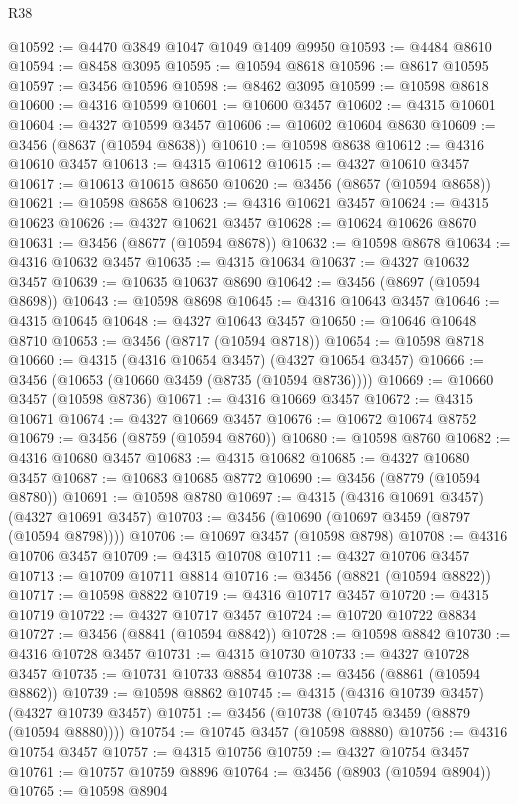 \begin{lexlean}{R38}
\begin{coremodule}
@10592 := @4470 @3849 @1047 @1049 @1409 @9950
@10593 := @4484 @8610
@10594 := @8458 @3095
@10595 := @10594 @8618
@10596 := @8617 @10595
@10597 := @3456 @10596
@10598 := @8462 @3095
@10599 := @10598 @8618
@10600 := @4316 @10599
@10601 := @10600 @3457
@10602 := @4315 @10601
@10604 := @4327 @10599 @3457
@10606 := @10602 @10604 @8630
@10609 := @3456 (@8637 (@10594 @8638))
@10610 := @10598 @8638
@10612 := @4316 @10610 @3457
@10613 := @4315 @10612
@10615 := @4327 @10610 @3457
@10617 := @10613 @10615 @8650
@10620 := @3456 (@8657 (@10594 @8658))
@10621 := @10598 @8658
@10623 := @4316 @10621 @3457
@10624 := @4315 @10623
@10626 := @4327 @10621 @3457
@10628 := @10624 @10626 @8670
@10631 := @3456 (@8677 (@10594 @8678))
@10632 := @10598 @8678
@10634 := @4316 @10632 @3457
@10635 := @4315 @10634
@10637 := @4327 @10632 @3457
@10639 := @10635 @10637 @8690
@10642 := @3456 (@8697 (@10594 @8698))
@10643 := @10598 @8698
@10645 := @4316 @10643 @3457
@10646 := @4315 @10645
@10648 := @4327 @10643 @3457
@10650 := @10646 @10648 @8710
@10653 := @3456 (@8717 (@10594 @8718))
@10654 := @10598 @8718
@10660 := @4315 (@4316 @10654 @3457) (@4327 @10654 @3457)
@10666 := @3456 (@10653 (@10660 @3459 (@8735 (@10594 @8736))))
@10669 := @10660 @3457 (@10598 @8736)
@10671 := @4316 @10669 @3457
@10672 := @4315 @10671
@10674 := @4327 @10669 @3457
@10676 := @10672 @10674 @8752
@10679 := @3456 (@8759 (@10594 @8760))
@10680 := @10598 @8760
@10682 := @4316 @10680 @3457
@10683 := @4315 @10682
@10685 := @4327 @10680 @3457
@10687 := @10683 @10685 @8772
@10690 := @3456 (@8779 (@10594 @8780))
@10691 := @10598 @8780
@10697 := @4315 (@4316 @10691 @3457) (@4327 @10691 @3457)
@10703 := @3456 (@10690 (@10697 @3459 (@8797 (@10594 @8798))))
@10706 := @10697 @3457 (@10598 @8798)
@10708 := @4316 @10706 @3457
@10709 := @4315 @10708
@10711 := @4327 @10706 @3457
@10713 := @10709 @10711 @8814
@10716 := @3456 (@8821 (@10594 @8822))
@10717 := @10598 @8822
@10719 := @4316 @10717 @3457
@10720 := @4315 @10719
@10722 := @4327 @10717 @3457
@10724 := @10720 @10722 @8834
@10727 := @3456 (@8841 (@10594 @8842))
@10728 := @10598 @8842
@10730 := @4316 @10728 @3457
@10731 := @4315 @10730
@10733 := @4327 @10728 @3457
@10735 := @10731 @10733 @8854
@10738 := @3456 (@8861 (@10594 @8862))
@10739 := @10598 @8862
@10745 := @4315 (@4316 @10739 @3457) (@4327 @10739 @3457)
@10751 := @3456 (@10738 (@10745 @3459 (@8879 (@10594 @8880))))
@10754 := @10745 @3457 (@10598 @8880)
@10756 := @4316 @10754 @3457
@10757 := @4315 @10756
@10759 := @4327 @10754 @3457
@10761 := @10757 @10759 @8896
@10764 := @3456 (@8903 (@10594 @8904))
@10765 := @10598 @8904

\end{coremodule}
\end{lexlean}
